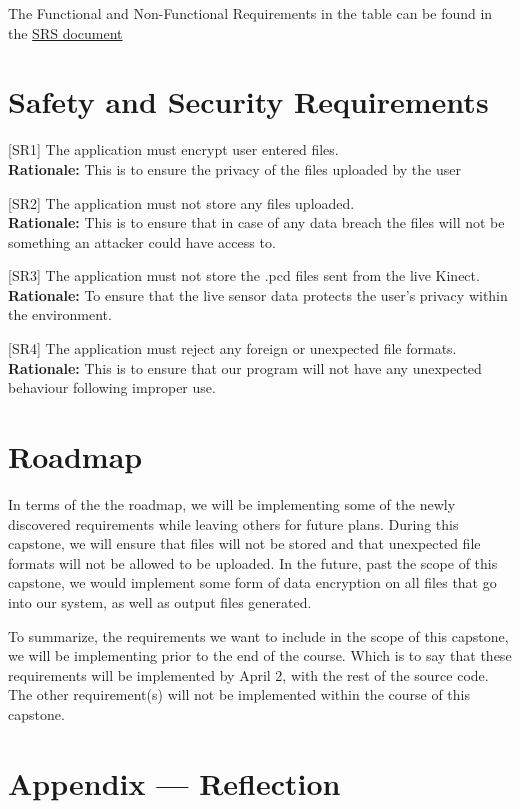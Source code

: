 \documentclass{article}
\begin{document}
The Functional and Non-Functional Requirements in the table can be found in the \href{https://github.com/takhtart/PCD/blob/main/docs/SRS/SRS.pdf}{SRS document}

\section{Safety and Security Requirements}

[SR1] The application must encrypt user entered files.\\
\textbf{Rationale:} This is to ensure the privacy of the files uploaded by the user

[SR2] The application must not store any files uploaded.\\
\textbf{Rationale:} This is to ensure that in case of any data breach the files will not be something an attacker could have access to.

[SR3] The application must not store the .pcd files sent from the live Kinect.\\
\textbf{Rationale:} To ensure that the live sensor data protects the user's privacy within the environment.

[SR4] The application must reject any foreign or unexpected file formats.\\
\textbf{Rationale:} This is to ensure that our program will not have any unexpected behaviour following improper use.

\section{Roadmap}


In terms of the the roadmap, we will be implementing some of the newly discovered requirements while leaving others for future plans. During this capstone,
we will ensure that files will not be stored and that unexpected file formats will not be allowed to be uploaded. In the future, past the scope of this capstone,
we would implement some form of data encryption on all files that go into our system, as well as output files generated.

To summarize, the requirements we want to include in the scope of this capstone, we will be implementing prior to the end of the course. Which is to say 
that these requirements will be implemented by April 2, with the rest of the source code. The other requirement(s) will not be implemented within the course of this capstone.



\newpage{}

\section*{Appendix --- Reflection}



\end{document}
